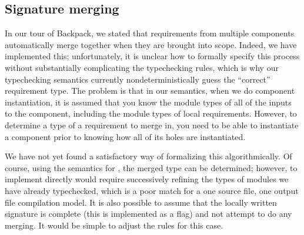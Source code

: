 \subsection{Signature merging}
\label{sec:merging}

In our tour of Backpack, we stated that requirements from multiple
components automatically merge together when they are brought into
scope.  Indeed, we have implemented this; unfortunately, it is unclear
how to formally specify this process without substantially complicating
the typechecking rules, which is why our typechecking semantics
currently nondeterministically guess the ``correct'' requirement type.
The problem is that in our semantics, when we do component
instantiation, it is assumed that you know the module types of all of
the inputs to the component, including the module types of local
requirements.  However, to determine a type of a requirement to merge
in, you need to be able to instantiate a component prior to knowing how
all of its holes are instantiated.

We have not yet found a satisfactory way of formalizing this
algorithmically.  Of course, using the semantics for \OldBackpack{}, the
merged type can be determined; however, to implement \OldBackpack{}
directly would require successively refining the types of modules we
have already typechecked, which is a poor match for a one source file,
one output file compilation model.  It is also possible to assume
that the locally written signature is complete (this is implemented
as a flag) and not attempt to do any merging.  It would be simple to
adjust the rules for this case.
